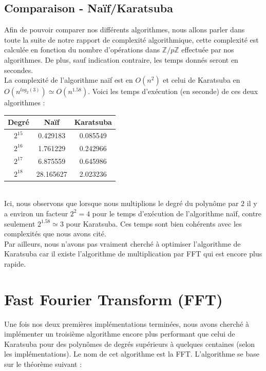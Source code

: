 \documentclass[12pt, a4paper]{article}
\begin{document}
\subsection{Comparaison - Naïf/Karatsuba}
Afin de pouvoir comparer nos différents algorithmes, nous allons parler dans toute la suite de notre rapport de complexité algorithmique, cette complexité est calculée en fonction du nombre d'opérations dans $\mathbb{Z}/p\mathbb{Z}$ effectuée par nos algorithmes. De plus, sauf indication contraire, les temps donnés seront en secondes.\\
\indent La complexité de l'algorithme naïf est en $O(n^2)$ et celui de Karatsuba en ${O(n^{log_2(3)}) \simeq O(n^{1.58})}$. Voici les temps d'exécution (en seconde) de ces deux algorithmes :
\begin{center}
\begin{tabular}{||c c c||}
\hline
Degré & Naïf & Karatsuba \\
\hline\hline
$2^{15}$ & 0.429183 & 0.085549 \\
\hline
$2^{16}$ & 1.761229 & 0.242966 \\
\hline
$2^{17}$ & 6.875559 & 0.645986 \\
\hline
$2^{18}$ & 28.165627 & 2.023236 \\
\hline
\end{tabular}
\end{center}
{}
\ \\
\indent Ici, nous observons que lorsque nous multiplions le degré du polynôme par $2$ il y a environ un facteur $2^2 = 4$ pour le temps d'exécution de l'algorithme naïf, contre seulement $2^{1.58} \simeq 3$ pour Karatsuba. Ces temps sont bien cohérents avec les complexités que nous avons cité. \\
\indent Par ailleurs, nous n'avons pas vraiment cherché à optimiser l'algorithme de Karatsuba car il existe l'algorithme de multiplication par FFT qui est encore plus rapide.

\newpage

\section{Fast Fourier Transform (FFT)}

Une fois nos deux premières implémentations terminées, nous avons cherché à implémenter un troisième algorithme encore plus performant que celui de Karatsuba pour des polynômes de degrés supérieurs à quelques centaines (selon les implémentations). Le nom de cet algorithme est la FFT. L'algorithme se base sur le théorème suivant :
\end{document}
